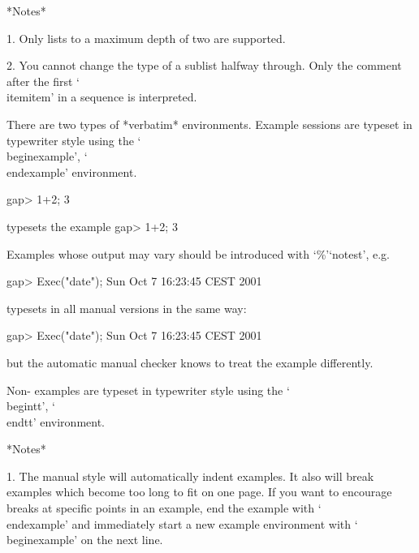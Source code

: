*Notes*

\beginlist%
\item{1.} Only lists to a maximum depth of two are supported.

\item{2.} You cannot change the type of a sublist halfway through. Only
the comment after the first `\\itemitem' in a sequence is interpreted.

\endlist

\indextt{\\begintt}\indextt{\\endtt}
\indextt{\\beginexample}\indextt{\\endexample}
There are two types of *verbatim* environments.
Example {\GAP} sessions are typeset in typewriter style
using the `\\beginexample', `\\endexample' environment.

\begintt
\beginexample
gap> 1+2;
3
\endexample
\endtt

typesets the example
\beginexample
gap> 1+2;
3
\endexample

Examples whose output may vary should be introduced with `\%'`notest',
e.g.

\begintt
\beginexample
gap> Exec("date");
Sun Oct  7 16:23:45 CEST 2001
\endexample
\endtt

typesets in all manual versions in the same way:

\beginexample
gap> Exec("date");
Sun Oct  7 16:23:45 CEST 2001
\endexample

but the automatic manual checker knows to treat the example differently.

Non-{\GAP} examples are typeset in typewriter style
using the `\\begintt', `\\endtt' environment.

*Notes*

\beginlist%

\item{1.}
The manual style will automatically indent examples. It also will break
examples which become too long to fit on one page. If you want to encourage
breaks at specific points in an example, end the example with `\\endexample'
and immediately start a new example environment with `\\beginexample' on
the next line.


